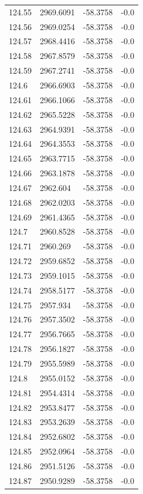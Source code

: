 \begin{table}[H]
\begin{tabular}{llll}
124.55 & 2969.6091 & -58.3758 & -0.0 \\
124.56 & 2969.0254 & -58.3758 & -0.0 \\
124.57 & 2968.4416 & -58.3758 & -0.0 \\
124.58 & 2967.8579 & -58.3758 & -0.0 \\
124.59 & 2967.2741 & -58.3758 & -0.0 \\
124.6 & 2966.6903 & -58.3758 & -0.0 \\
124.61 & 2966.1066 & -58.3758 & -0.0 \\
124.62 & 2965.5228 & -58.3758 & -0.0 \\
124.63 & 2964.9391 & -58.3758 & -0.0 \\
124.64 & 2964.3553 & -58.3758 & -0.0 \\
124.65 & 2963.7715 & -58.3758 & -0.0 \\
124.66 & 2963.1878 & -58.3758 & -0.0 \\
124.67 & 2962.604 & -58.3758 & -0.0 \\
124.68 & 2962.0203 & -58.3758 & -0.0 \\
124.69 & 2961.4365 & -58.3758 & -0.0 \\
124.7 & 2960.8528 & -58.3758 & -0.0 \\
124.71 & 2960.269 & -58.3758 & -0.0 \\
124.72 & 2959.6852 & -58.3758 & -0.0 \\
124.73 & 2959.1015 & -58.3758 & -0.0 \\
124.74 & 2958.5177 & -58.3758 & -0.0 \\
124.75 & 2957.934 & -58.3758 & -0.0 \\
124.76 & 2957.3502 & -58.3758 & -0.0 \\
124.77 & 2956.7665 & -58.3758 & -0.0 \\
124.78 & 2956.1827 & -58.3758 & -0.0 \\
124.79 & 2955.5989 & -58.3758 & -0.0 \\
124.8 & 2955.0152 & -58.3758 & -0.0 \\
124.81 & 2954.4314 & -58.3758 & -0.0 \\
124.82 & 2953.8477 & -58.3758 & -0.0 \\
124.83 & 2953.2639 & -58.3758 & -0.0 \\
124.84 & 2952.6802 & -58.3758 & -0.0 \\
124.85 & 2952.0964 & -58.3758 & -0.0 \\
124.86 & 2951.5126 & -58.3758 & -0.0 \\
124.87 & 2950.9289 & -58.3758 & -0.0 \\

\end{tabular}
\end{table}
